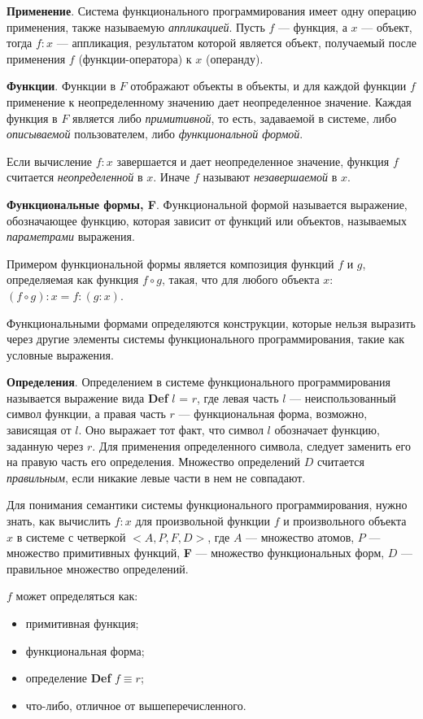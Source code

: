 \textbf{Применение}. Система функционального программирования имеет одну
операцию применения, также называемую \textit{аппликацией}. Пусть $f$ ---
функция, а $x$ --- объект, тогда $f:x$ --- аппликация, результатом которой
является объект, получаемый после применения $f$ (функции-оператора) 
к $x$ (операнду).

\textbf{Функции}. Функции в $F$ отображают объекты в объекты, и для каждой
функции $f$ применение к неопределенному значению дает неопределенное значение.
Каждая функция в $F$ является либо \textit{примитивной}, то есть, задаваемой
в системе, либо \textit{описываемой} пользователем, либо \textit{функциональной формой}.

Если вычисление $f:x$ завершается и дает неопределенное значение, функция
$f$ считается \textit{неопределенной} в $x$. Иначе $f$ называют
\textit{незавершаемой} в $x$.

\textbf{Функциональные формы, F}. Функциональной формой называется выражение,
обозначающее функцию, которая зависит от функций или объектов, называемых
\textit{параметрами} выражения. 

Примером функциональной формы является композиция функций $f$ и $g$, 
определяемая как функция $f \circ g$, такая, что для любого объекта $x$:
$(f \circ g) : x = f : (g : x)$.

Функциональными формами определяются конструкции, которые нельзя выразить
через другие элементы системы функционального программирования, такие как
условные выражения.

\textbf{Определения}. Определением в системе функционального программирования
называется выражение вида \textbf{Def} $l$ = $r$, где левая
часть $l$ --- неиспользованный символ функции, а правая часть $r$ ---
функциональная форма, возможно, зависящая от $l$. Оно выражает тот факт, что
символ $l$ обозначает функцию, заданную через $r$. Для применения определенного
символа, следует заменить его на правую часть его определения.
Множество определений $D$ считается \textit{правильным}, если никакие
левые части в нем не совпадают.

Для понимания семантики системы функционального программирования, нужно знать, как
вычислить $f:x$ для произвольной функции $f$ и произвольного объекта $x$
в системе с четверкой $<A, P, F, D>$, где $A$ --- множество атомов,
$P$ --- множество примитивных функций, \textbf{F} --- множество функциональных
форм, $D$ --- правильное множество определений.

$f$ может определяться как:
\begin{itemize}
    \item примитивная функция;
    \item функциональная форма;
    \item определение \textbf{Def} $f \equiv r$;
    \item что-либо, отличное от вышеперечисленного.
\end{itemize}

